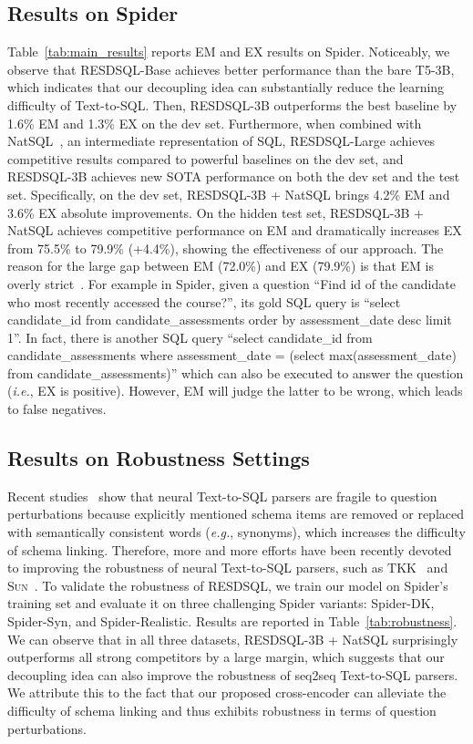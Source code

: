 \documentclass[letterpaper]{article} \usepackage{aaai23}  \usepackage{times}  \usepackage{helvet}  \usepackage{courier}  \usepackage[hyphens]{url}  \usepackage{graphicx} \urlstyle{rm} \def\UrlFont{\rm}  \usepackage{natbib}  \usepackage{caption} \frenchspacing  \setlength{\pdfpagewidth}{8.5in}  \setlength{\pdfpageheight}{11in}  \usepackage{algorithm}
\newcommand{\model}{RESDSQL}
\begin{document}
\subsection{Results on Spider}
Table~\ref{tab:main_results} reports EM and EX results on Spider. Noticeably, we observe that \model-Base achieves better performance than the bare T5-3B, which indicates that our decoupling idea can substantially reduce the learning difficulty of Text-to-SQL. Then, \model-3B outperforms the best baseline by 1.6\% EM and 1.3\% EX on the dev set. Furthermore, when combined with NatSQL~\citep{yujian2021naturalsql}, an intermediate representation of SQL, \model-Large achieves competitive results compared to powerful baselines on the dev set, and \model-3B achieves new SOTA performance on both the dev set and the test set. Specifically, on the dev set, \model-3B + NatSQL brings 4.2\% EM and 3.6\% EX absolute improvements. On the hidden test set, \model-3B + NatSQL achieves competitive performance on EM and dramatically increases EX from 75.5\% to 79.9\% (+4.4\%), showing the effectiveness of our approach. The reason for the large gap between EM (72.0\%) and EX (79.9\%) is that EM is overly strict~\citep{ruiqi2020semantic}. For example in Spider, given a question ``Find id of the candidate who most recently accessed the course?'', its gold SQL query is ``select candidate\_id from candidate\_assessments order by assessment\_date desc limit 1''. In fact, there is another SQL query ``select candidate\_id from candidate\_assessments where assessment\_date = (select max(assessment\_date) from candidate\_assessments)'' which can also be executed to answer the question (\emph{i.e.}, EX is positive). However, EM will judge the latter to be wrong, which leads to false negatives.

\subsection{Results on Robustness Settings}
Recent studies~\citep{yujian2021towards, xiang2021structure} show that neural Text-to-SQL parsers are fragile to question perturbations because explicitly mentioned schema items are removed or replaced with semantically consistent words (\emph{e.g.}, synonyms), which increases the difficulty of schema linking. Therefore, more and more efforts have been recently devoted to improving the robustness of neural Text-to-SQL parsers, such as TKK~\citep{bowen2022sun} and S\textsc{un}~\citep{chang2022towards}. To validate the robustness of \model, we train our model on Spider's training set and evaluate it on three challenging Spider variants: Spider-DK, Spider-Syn, and Spider-Realistic. Results are reported in Table~\ref{tab:robustness}. We can observe that in all three datasets, \model-3B + NatSQL surprisingly outperforms all strong competitors by a large margin, which suggests that our decoupling idea can also improve the robustness of seq2seq Text-to-SQL parsers. We attribute this to the fact that our proposed cross-encoder can alleviate the difficulty of schema linking and thus exhibits robustness in terms of question perturbations.
\end{document}
